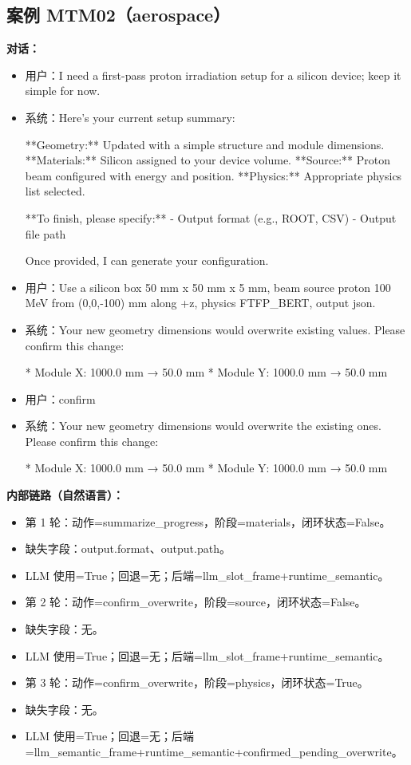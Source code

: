 \documentclass[11pt]{ctexart}
\begin{document}
\subsection{案例 MTM02（aerospace）}
\textbf{对话：}
\begin{itemize}
\item 用户：I need a first-pass proton irradiation setup for a silicon device; keep it simple for now.
\item 系统：Here's your current setup summary:

**Geometry:** Updated with a simple structure and module dimensions.
**Materials:** Silicon assigned to your device volume.
**Source:** Proton beam configured with energy and position.
**Physics:** Appropriate physics list selected.

**To finish, please specify:**
- Output format (e.g., ROOT, CSV)
- Output file path

Once provided, I can generate your configuration.
\item 用户：Use a silicon box 50 mm x 50 mm x 5 mm, beam source proton 100 MeV from (0,0,-100) mm along +z, physics FTFP\_BERT, output json.
\item 系统：Your new geometry dimensions would overwrite existing values. Please confirm this change:

*   Module X: 1000.0 mm → 50.0 mm
*   Module Y: 1000.0 mm → 50.0 mm
\item 用户：confirm
\item 系统：Your new geometry dimensions would overwrite the existing ones. Please confirm this change:

*   Module X: 1000.0 mm → 50.0 mm
*   Module Y: 1000.0 mm → 50.0 mm
\end{itemize}
\textbf{内部链路（自然语言）：}
\begin{itemize}
\item 第 1 轮：动作=summarize\_progress，阶段=materials，闭环状态=False。
\item 缺失字段：output.format、output.path。
\item LLM 使用=True；回退=无；后端=llm\_slot\_frame+runtime\_semantic。
\item 第 2 轮：动作=confirm\_overwrite，阶段=source，闭环状态=False。
\item 缺失字段：无。
\item LLM 使用=True；回退=无；后端=llm\_slot\_frame+runtime\_semantic。
\item 第 3 轮：动作=confirm\_overwrite，阶段=physics，闭环状态=True。
\item 缺失字段：无。
\item LLM 使用=True；回退=无；后端=llm\_semantic\_frame+runtime\_semantic+confirmed\_pending\_overwrite。
\end{itemize}
\end{document}
